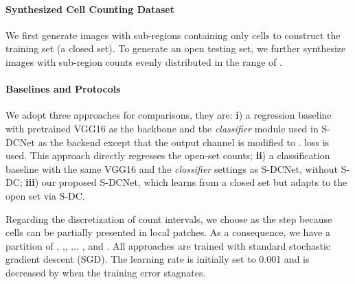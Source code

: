 \documentclass[10pt,twocolumn,letterpaper]{article}
\begin{document}
	\iffalse
	\begin{figure}[t]
		\begin{center}
			\texttt{[image: toy\_regression.jpg]}
		\end{center}
		\vspace{-10pt}
		\caption{An example of univariate regression with . We adopt a three-layer multi-layer perception (MLP) with  hidden units as the regressor. Training samples are within the range of . It can be observed the regressor performs precisely in the training range while fails outside such a range. }
		\label{fig:toy_regression}
		\vspace{-10pt}
	\end{figure}
	\fi
	
	\vspace{-10pt}
	\paragraph{Synthesized Cell Counting Dataset}
	We first generate   images with  sub-regions containing only  cells to construct the training set (a closed set). To generate an open testing set, we further synthesize  images with sub-region counts evenly distributed in the range of . 


	\vspace{-10pt}
	\paragraph{Baselines and Protocols}
	We adopt three approaches for comparisons, they are: 
	\textbf{i}) a regression baseline with pretrained VGG16 as the backbone and the \textit{classifier} module used in S-DCNet as the backend except that the output channel is modified to .  loss is used. This approach directly regresses the open-set counts;
	\textbf{ii}) a classification baseline with the same VGG16 and the \textit{classifier} settings as S-DCNet, without S-DC;
	\textbf{iii}) our proposed S-DCNet, which learns from a closed set but adapts to the open set via S-DC.  
	
	Regarding the discretization of count intervals, we choose  as the step because cells can be partially presented in local patches. As a consequence, we have a partition of , ,, ... , and . All approaches are trained with standard stochastic gradient descent (SGD). The learning rate is initially set to 0.001 and is decreased by  when the training error stagnates.
	
	\vspace{-10pt}
\end{document}
